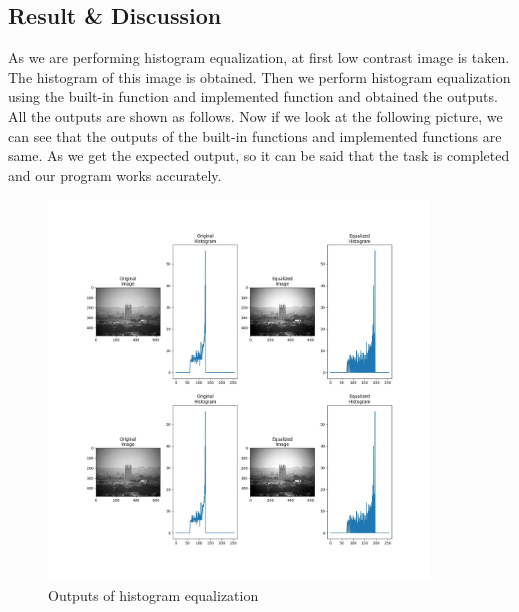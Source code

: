 \documentclass{article}
\begin{document}
{    \subsection{Result & Discussion}{
        As we are performing histogram equalization, at first low contrast image is taken. The histogram of this image is obtained. Then we perform histogram equalization using the built-in function and implemented function and obtained the outputs. All the outputs are shown as follows. Now if we look at the following picture, we can see that the outputs of the built-in functions and implemented functions are same. As we get the expected output, so it can be said that the task is completed and our program works accurately.
        
        \begin{figure}[htp]
            \centering
            \includegraphics[width=0.9\textwidth]{Assignment-10/fig-1.jpg}
            \caption{Outputs of histogram equalization}
        \end{figure}
    }
}
\clearpage
\end{document}
